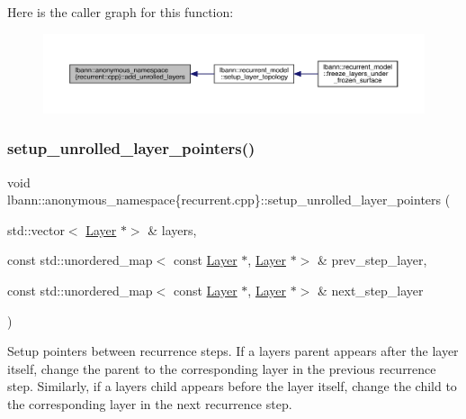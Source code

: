 Here is the caller graph for this function\+:\nopagebreak
\begin{figure}[H]
\begin{center}
\leavevmode
\includegraphics[width=350pt]{namespacelbann_1_1anonymous__namespace_02recurrent_8cpp_03_a16733e1fb301c3099a5fe07d703c3782_icgraph}
\end{center}
\end{figure}
\mbox{\label{namespacelbann_1_1anonymous__namespace_02recurrent_8cpp_03_a12a6f96a1c15c91218169bf7157cd800}} 
\subsubsection{\texorpdfstring{setup\+\_\+unrolled\+\_\+layer\+\_\+pointers()}{setup\_unrolled\_layer\_pointers()}}
{\footnotesize\ttfamily void lbann\+::anonymous\+\_\+namespace\{recurrent.\+cpp\}\+::setup\+\_\+unrolled\+\_\+layer\+\_\+pointers (\begin{DoxyParamCaption}\item[{std\+::vector$<$ \hyperlink{classlbann_1_1Layer}{Layer} $\ast$$>$ \&}]{layers,  }\item[{const std\+::unordered\+\_\+map$<$ const \hyperlink{classlbann_1_1Layer}{Layer} $\ast$, \hyperlink{classlbann_1_1Layer}{Layer} $\ast$$>$ \&}]{prev\+\_\+step\+\_\+layer,  }\item[{const std\+::unordered\+\_\+map$<$ const \hyperlink{classlbann_1_1Layer}{Layer} $\ast$, \hyperlink{classlbann_1_1Layer}{Layer} $\ast$$>$ \&}]{next\+\_\+step\+\_\+layer }\end{DoxyParamCaption})}

Setup pointers between recurrence steps. If a layer\textquotesingle{}s parent appears after the layer itself, change the parent to the corresponding layer in the previous recurrence step. Similarly, if a layer\textquotesingle{}s child appears before the layer itself, change the child to the corresponding layer in the next recurrence step. 

